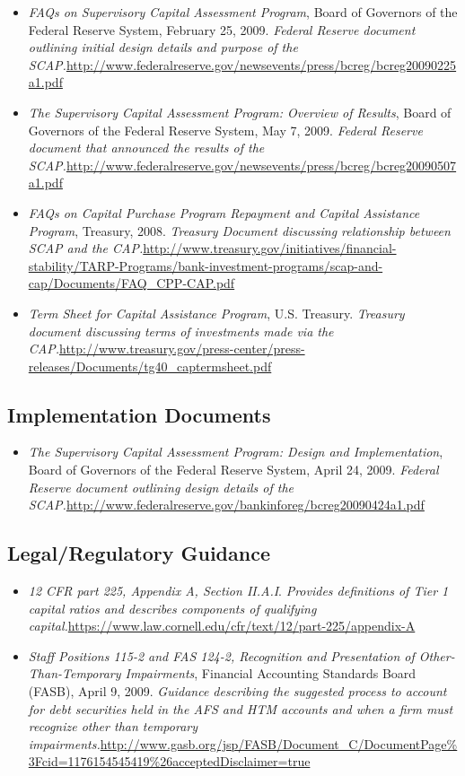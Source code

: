 \documentclass[12pt]{article}
\begin{document}
\begin{itemize}
\item
\emph{FAQs
  on Supervisory Capital Assessment Program}, Board of Governors of the
  Federal Reserve System, February 25, 2009. \emph{Federal Reserve
  document outlining initial design details and purpose of the SCAP.}\url{http://www.federalreserve.gov/newsevents/press/bcreg/bcreg20090225a1.pdf}
\item
   \emph{The Supervisory Capital Assessment Program: Overview of Results}, Board
  of Governors of the Federal Reserve System, May 7, 2009. \emph{Federal
  Reserve document that announced the results of the SCAP.}\url{http://www.federalreserve.gov/newsevents/press/bcreg/bcreg20090507a1.pdf}
\item
\emph{FAQs
  on Capital Purchase Program Repayment and Capital Assistance
  Program}, Treasury, 2008. \emph{Treasury Document discussing
  relationship between SCAP and the CAP.}\url{http://www.treasury.gov/initiatives/financial-stability/TARP-Programs/bank-investment-programs/scap-and-cap/Documents/FAQ_CPP-CAP.pdf}
\item
\emph{Term
  Sheet for Capital Assistance Program}, U.S. Treasury. \emph{Treasury
  document discussing terms of investments made via the CAP.}\url{http://www.treasury.gov/press-center/press-releases/Documents/tg40_captermsheet.pdf}
\end{itemize}

\subsection{Implementation Documents}
\begin{itemize}
\item
\emph{The
  Supervisory Capital Assessment Program: Design and Implementation},
  Board of Governors of the Federal Reserve System, April 24, 2009.
  \emph{Federal Reserve document outlining design details of the SCAP.}\url{http://www.federalreserve.gov/bankinforeg/bcreg20090424a1.pdf}
\end{itemize}

\subsection{Legal/Regulatory Guidance}

\begin{itemize}
\item
\emph{12
  CFR part 225, Appendix A, Section II.A.I}. \emph{Provides definitions
  of Tier 1 capital ratios and describes components of qualifying
  capital.}\url{https://www.law.cornell.edu/cfr/text/12/part-225/appendix-A}
\item
\emph{Staff
  Positions 115-2 and FAS 124-2, Recognition and Presentation of
  Other-Than-Temporary Impairments}, Financial Accounting Standards
  Board (FASB), April 9, 2009. \emph{Guidance describing the suggested
  process to account for debt securities held in the AFS and HTM
  accounts and when a firm must recognize other than temporary
  impairments.}\url{http://www.gasb.org/jsp/FASB/Document_C/DocumentPage\%3Fcid=1176154545419\%26acceptedDisclaimer=true}
\end{itemize}
\end{document}
